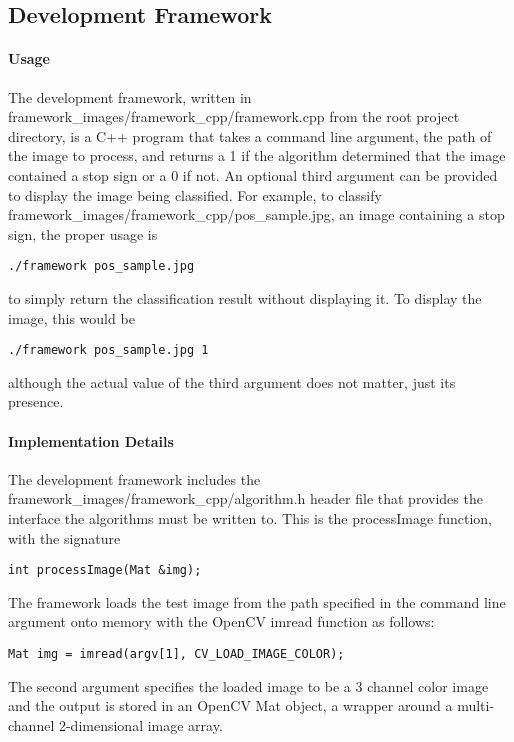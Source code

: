 \documentclass[letterpaper,10pt,titlepage]{article}
\begin{document}

\subsection*{Development Framework}
\paragraph*{Usage}
The development framework, written in
framework\_images/framework\_cpp/framework.cpp from the root project directory,
is a C++ program that takes a command line argument, the path of the image to
process, and returns a 1 if the algorithm determined that the image contained a
stop sign or a 0 if not. An optional third argument can be provided to display
the image being classified. For example, to classify 
framework\_images/framework\_cpp/pos\_sample.jpg, an image containing a stop
sign, the proper usage is
\begin{lstlisting}
./framework pos_sample.jpg
\end{lstlisting}
to simply return the classification result without displaying it. To display
the image, this would be
\begin{lstlisting}
./framework pos_sample.jpg 1
\end{lstlisting}
although the actual value of the third argument does not matter, just its 
presence.
\paragraph*{Implementation Details}
The development framework includes the
framework\_images/framework\_cpp/algorithm.h header file that provides the 
interface the algorithms must be written to. This is the processImage function,
with the signature
\begin{lstlisting}
int processImage(Mat &img);
\end{lstlisting}
The framework loads the test image from the path specified in the command line 
argument onto memory with the OpenCV imread function as follows:
\begin{lstlisting}
Mat img = imread(argv[1], CV_LOAD_IMAGE_COLOR);
\end{lstlisting}
The second argument specifies the loaded image to be a 3 channel color image
and the output is stored in an OpenCV Mat object, a wrapper around a 
multi-channel 2-dimensional image array.
\end{document}

